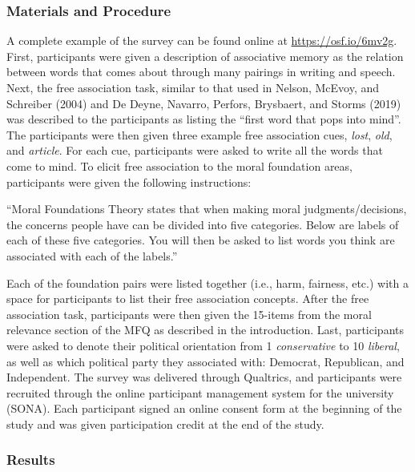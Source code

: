 \documentclass[
  man,floatsintext]{apa6}
\begin{document}
\subsubsection{Materials and Procedure}\label{materials-and-procedure}

A complete example of the survey can be found online at
\url{https://osf.io/6mv2g}. First, participants were given a description of
associative memory as the relation between words that comes about
through many pairings in writing and speech. Next, the free association
task, similar to that used in Nelson, McEvoy, and Schreiber (2004) and De Deyne, Navarro, Perfors, Brysbaert, and Storms (2019) was described
to the participants as listing the ``first word that pops into mind''. The
participants were then given three example free association cues,
\emph{lost}, \emph{old}, and \emph{article}. For each cue, participants were asked to
write all the words that come to mind. To elicit free association to the
moral foundation areas, participants were given the following
instructions:

``Moral Foundations Theory states that when making moral
judgments/decisions, the concerns people have can be divided into five
categories. Below are labels of each of these five categories. You will
then be asked to list words you think are associated with each of the
labels.''

Each of the foundation pairs were listed together (i.e., harm,
fairness, etc.) with a space for participants to list
their free association concepts. After the free association task,
participants were then given the 15-items from the moral relevance
section of the MFQ as described in the introduction. Last, participants
were asked to denote their political orientation from 1 \emph{conservative}
to 10 \emph{liberal}, as well as which political party they associated with:
Democrat, Republican, and Independent. The survey was delivered through
Qualtrics, and participants were recruited through the online
participant management system for the university (SONA). Each
participant signed an online consent form at the beginning of the study
and was given participation credit at the end of the study.

\subsubsection{Results}\label{results}
\end{document}
